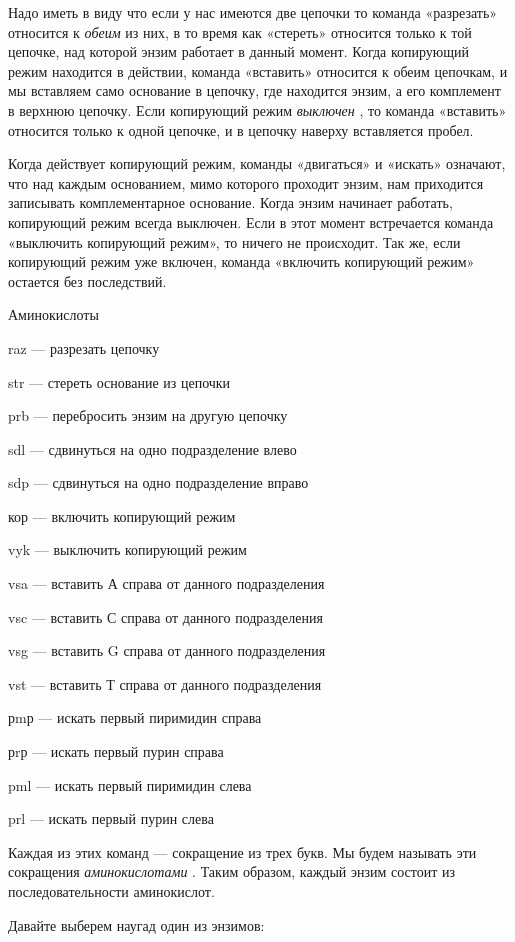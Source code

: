 \documentclass[../main.tex]{subfiles}
\begin{document}
Надо иметь в виду что если у нас имеются две цепочки то команда «разрезать» относится к \emph{обеим} из них, в то время как «стереть» относится только к той цепочке, над которой энзим работает в данный момент. Когда копирующий режим находится в действии, команда «вставить» относится к обеим цепочкам, и мы вставляем само основание в цепочку, где находится энзим, а его комплемент в верхнюю цепочку. Если копирующий режим \emph{выключен} , то команда «вставить» относится только к одной цепочке, и в цепочку наверху вставляется пробел.

Когда действует копирующий режим, команды «двигаться» и «искать» означают, что над каждым основанием, мимо которого проходит энзим, нам приходится записывать комплементарное основание. Когда энзим начинает работать, копирующий режим всегда выключен. Если в этот момент встречается команда «выключить копирующий режим», то ничего не происходит. Так же, если копирующий режим уже включен, команда «включить копирующий режим» остается без последствий.

Аминокислоты

raz --- разрезать цепочку

str --- стереть основание из цепочки

prb --- перебросить энзим на другую цепочку

sdl --- сдвинуться на одно подразделение влево

sdp --- сдвинуться на одно подразделение вправо

кор --- включить копирующий режим

vyk --- выключить копирующий режим

vsa --- вставить А справа от данного подразделения

vsc --- вставить С справа от данного подразделения

vsg --- вставить G справа от данного подразделения

vst --- вставить Т справа от данного подразделения

рmр --- искать первый пиримидин справа

рrр --- искать первый пурин справа

pml --- искать первый пиримидин слева

prl --- искать первый пурин слева

Каждая из этих команд --- сокращение из трех букв. Мы будем называть эти сокращения \emph{аминокислотами} . Таким образом, каждый энзим состоит из последовательности аминокислот.

Давайте выберем наугад один из энзимов:
\end{document}
